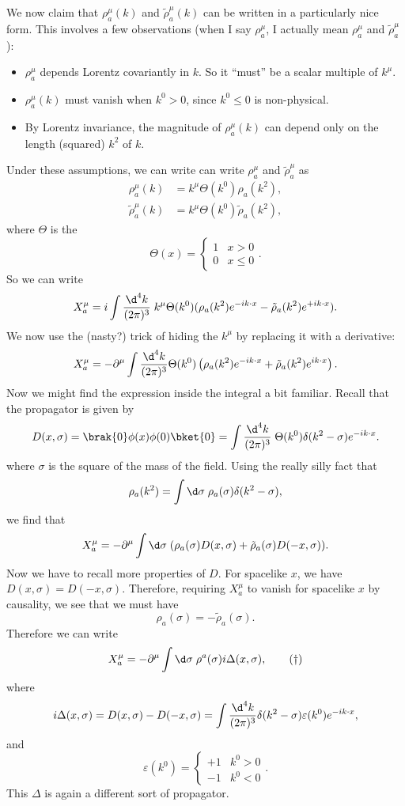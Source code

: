\documentclass[a4paper]{article}
\begin{document}
We now claim that $\rho_a^\mu(k)$ and $\tilde{\rho}_a^\mu(k)$ can be written in a particularly nice form. This involves a few observations (when I say $\rho_a^\mu$, I actually mean $\rho_a^\mu$ and $\tilde{\rho}_a^\mu$):
\begin{itemize}
  \item $\rho_a^\mu$ depends Lorentz covariantly in $k$. So it ``must'' be a scalar multiple of $k^\mu$.
  \item $\rho_a^\mu(k)$ must vanish when $k^0 > 0$, since $k^0 \leq 0$ is non-physical. %
  \item By Lorentz invariance, the magnitude of $\rho_a^\mu(k)$ can depend only on the length (squared) $k^2$ of $k$.
\end{itemize}
Under these assumptions, we can write can write $\rho_a^\mu$ and $\tilde{\rho}_a^\mu$ as
\begin{align*}
  \rho_a^\mu (k) &= k^\mu \Theta(k^0) \rho_a (k^2),\\
  \tilde{\rho}_a^\mu (k) &= k^\mu \Theta(k^0) \tilde{\rho}_a(k^2),
\end{align*}
where $\Theta$ is the 
\[
  \Theta(x) = 
  \begin{cases}
    1 & x > 0\\
    0 & x \leq 0
  \end{cases}.
\]
So we can write
\[
  X_a^\mu = i \int \frac{\d^4 k}{(2\pi)^3}\;k^\mu \Theta(k^0) (\rho_a(k^2)e^{-ik\cdot x} - \tilde{\rho}_a(k^2) e^{+ik\cdot x}).
\]
We now use the (nasty?) trick of hiding the $k^\mu$ by replacing it with a derivative:
\[
  X_a^\mu = - \partial^\mu \int \frac{\d^4 k}{(2\pi)^3} \Theta(k^0)\left(\rho_a(k^2) e^{-ik\cdot x} + \tilde{\rho}_a(k^2) e^{ik\cdot x}\right).
\]
Now we might find the expression inside the integral a bit familiar. Recall that the propagator is given by
\[
  D(x, \sigma) = \brak{0} \phi(x) \phi(0) \bket{0} = \int \frac{\d^4 k}{(2\pi)^3}\; \Theta(k^0) \delta(k^2 - \sigma) e^{-ik\cdot x}.
\]
where $\sigma$ is the square of the mass of the field. Using the really silly fact that
\[
  \rho_a(k^2) = \int \d \sigma\; \rho_a(\sigma) \delta(k^2 - \sigma),
\]
we find that
\[
  X_a^\mu = -\partial^\mu \int \d \sigma\; (\rho_a(\sigma) D(x, \sigma) + \tilde{\rho}_a (\sigma) D(-x, \sigma)).
\]
Now we have to recall more properties of $D$. For spacelike $x$, we have $D(x, \sigma) = D(-x, \sigma)$. Therefore, requiring $X_a^\mu$ to vanish for spacelike $x$ by causality, we see that we must have
\[
  \rho_a(\sigma) = - \tilde{\rho}_a(\sigma).
\]
Therefore we can write
\[
  X_a^\mu = -\partial^\mu \int \d \sigma\; \rho^a(\sigma) i\Delta(x, \sigma),\tag{$\dagger$}
\]
where
\[
  i \Delta(x, \sigma) = D(x, \sigma) - D(-x, \sigma) = \int \frac{\d^4 k}{(2\pi)^3} \delta(k^2 - \sigma) \varepsilon(k^0) e^{-ik\cdot x},
\]
and
\[
  \varepsilon(k^0) =
  \begin{cases}
    +1 & k^0 > 0\\
    -1 & k^0 < 0
  \end{cases}.
\]
This $\Delta$ is again a different sort of propagator.
\end{document}
